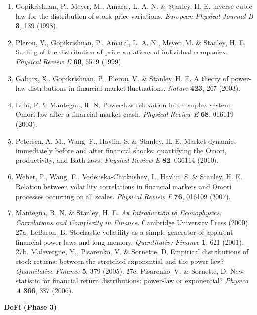 \documentclass[
  11pt]{article}
\providecommand{\tightlist}{%
  \setlength{\itemsep}{0pt}\setlength{\parskip}{0pt}}
\begin{document}
\begin{enumerate}
\def\labelenumi{\arabic{enumi}.}
\setcounter{enumi}{20}
\tightlist
\item
  Gopikrishnan, P., Meyer, M., Amaral, L. A. N. \& Stanley, H. E.
  Inverse cubic law for the distribution of stock price variations.
  \emph{European Physical Journal B} \textbf{3}, 139 (1998).
\item
  Plerou, V., Gopikrishnan, P., Amaral, L. A. N., Meyer, M. \& Stanley,
  H. E. Scaling of the distribution of price variations of individual
  companies. \emph{Physical Review E} \textbf{60}, 6519 (1999).
\item
  Gabaix, X., Gopikrishnan, P., Plerou, V. \& Stanley, H. E. A theory of
  power-law distributions in financial market fluctuations.
  \emph{Nature} \textbf{423}, 267 (2003).
\item
  Lillo, F. \& Mantegna, R. N. Power-law relaxation in a complex system:
  Omori law after a financial market crash. \emph{Physical Review E}
  \textbf{68}, 016119 (2003).
\item
  Petersen, A. M., Wang, F., Havlin, S. \& Stanley, H. E. Market
  dynamics immediately before and after financial shocks: quantifying
  the Omori, productivity, and Bath laws. \emph{Physical Review E}
  \textbf{82}, 036114 (2010).
\item
  Weber, P., Wang, F., Vodenska-Chitkushev, I., Havlin, S. \& Stanley,
  H. E. Relation between volatility correlations in financial markets
  and Omori processes occurring on all scales. \emph{Physical Review E}
  \textbf{76}, 016109 (2007).
\item
  Mantegna, R. N. \& Stanley, H. E. \emph{An Introduction to
  Econophysics: Correlations and Complexity in Finance.} Cambridge
  University Press (2000). 27a. LeBaron, B. Stochastic volatility as a
  simple generator of apparent financial power laws and long memory.
  \emph{Quantitative Finance} \textbf{1}, 621 (2001). 27b. Malevergne,
  Y., Pisarenko, V. \& Sornette, D. Empirical distributions of stock
  returns: between the stretched exponential and the power law?
  \emph{Quantitative Finance} \textbf{5}, 379 (2005). 27c. Pisarenko, V.
  \& Sornette, D. New statistic for financial return distributions:
  power-law or exponential? \emph{Physica A} \textbf{366}, 387 (2006).
\end{enumerate}

\textbf{DeFi (Phase 3)}
\end{document}
